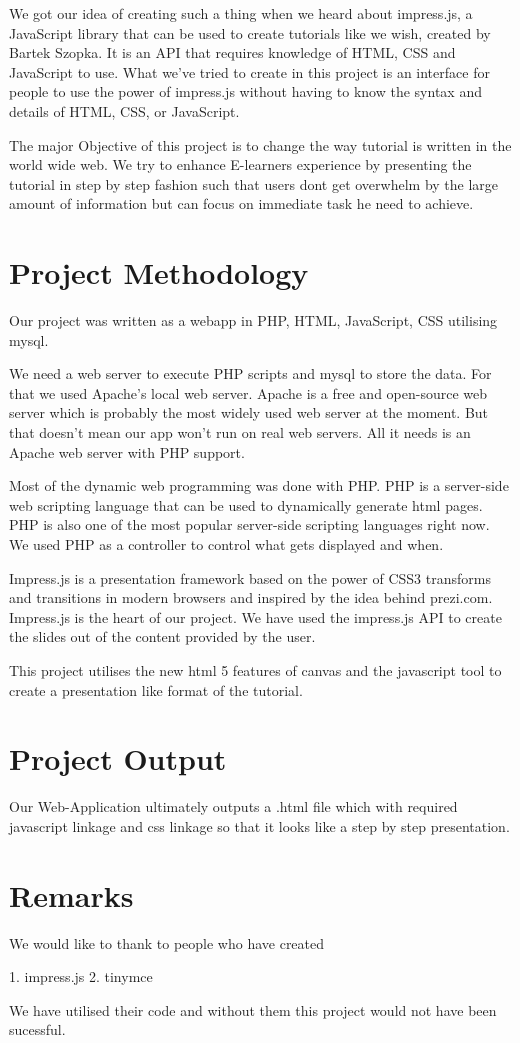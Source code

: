 \documentclass[12pt,a4paper]{article}
\begin{document}
We got our idea of creating such a thing when we heard about impress.js, a JavaScript library that can be used to create tutorials like we wish, created by Bartek Szopka. It is an API that requires knowledge of HTML, CSS and JavaScript to use. What we've tried to create in this project is an interface for people to use the power of impress.js without having to know the syntax and details of HTML, CSS, or JavaScript.

The major Objective of this project is to change the way tutorial is written in the world wide web. We try to enhance E-learners experience by presenting the tutorial in step by step fashion such that users dont get overwhelm by the large amount of information but can focus on immediate task he need to achieve. 

\section{Project Methodology}

Our project was written as a webapp in PHP, HTML, JavaScript, CSS utilising mysql.

We need a web server to execute PHP scripts and mysql to store the data. For that we used Apache's local web server. Apache is a free and open-source web server which is probably the most widely used web server at the moment. But that doesn't mean our app won't run on real web servers. All it needs is an Apache web server with PHP support.

Most of the dynamic web programming was done with PHP. PHP is a server-side web scripting language that can be used to dynamically generate html pages. PHP is also one of the most popular server-side scripting languages right now. We used PHP as a controller to control what gets displayed and when.

Impress.js is a presentation framework based on the power of CSS3 transforms and transitions in modern browsers and inspired by the idea behind prezi.com. Impress.js is the heart of our project. We have used the impress.js API to create the slides out of the content provided by the user.

This project utilises the new html 5 features of canvas and the javascript tool to create a presentation like format of the tutorial.

\section{Project Output}

Our Web-Application ultimately outputs a .html file which with required javascript linkage and css linkage so that it looks like a step by step presentation.

\section{Remarks}

We would like to thank to people who have created 

1. impress.js
2. tinymce

We have utilised their code and without them this project would not have been sucessful.
\end{document}
